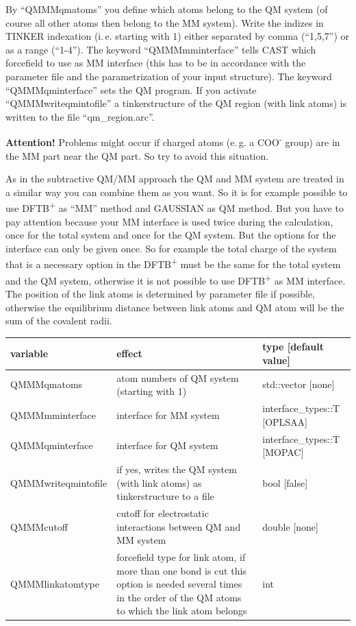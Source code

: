 \documentclass[10pt,a4paper]{article} %
\begin{document}
By ``QMMMqmatoms'' you define which atoms belong to the QM system (of course all other atoms then belong to the MM system). Write the indizes in TINKER indexation (i.\,e. starting with 1) either separated by comma (``1,5,7'') or as a range (``1-4''). The keyword ``QMMMmminterface'' tells CAST which forcefield to use as MM interface (this has to be in accordance with the parameter file and the parametrization of your input structure). The keyword ``QMMMqminterface'' sets the QM program. If you activate ``QMMMwriteqmintofile'' a tinkerstructure of the QM region (with link atoms) is written to the file ``qm\_region.arc''.

\textbf{Attention!} Problems might occur if charged atoms (e.\,g. a COO\textsuperscript{-} group) are in the MM part near the QM part. So try to avoid this situation.

As in the subtractive QM/MM approach the QM and MM system are treated in a similar way you can combine them as you want. So it is for example possible to use DFTB\textsuperscript{+} as ``MM'' method and GAUSSIAN as QM method. But you have to pay attention because your MM interface is used twice during the calculation, once for the total system and once for the QM system. But the options for the interface can only be given once. So for example the total charge of the system that is a necessary option in the DFTB\textsuperscript{+} must be the same for the total system and the QM system, otherwise it is not possible to use DFTB\textsuperscript{+} as MM interface. The position of the link atoms is determined by parameter file if possible, otherwise the equilibrium distance between link atoms and QM atom will be the sum of the covalent radii. 

			\begin{longtable}{|p{3.5cm}|p{5cm}|p{3cm}|}
		variable & effect & type [default value] \\
		\hline
			QMMMqmatoms  & atom numbers of QM system (starting with 1) & std::vector [none]\\
			QMMMmminterface  & interface for MM system & interface\_types::T [OPLSAA]\\
			QMMMqminterface & interface for QM system & interface\_types::T [MOPAC]\\
			QMMMwriteqmintofile & if yes, writes the QM system (with link atoms) as tinkerstructure to a file  &  bool [false]\\
            QMMMcutoff & cutoff for electrostatic interactions between QM and MM system & double [none]\\
			QMMMlinkatomtype   & forcefield type for link atom, if more than one bond is cut this option is needed several times in the order of the QM atoms to which the link atom belongs & int \\
		\end{longtable}~\\
	
\end{document}
